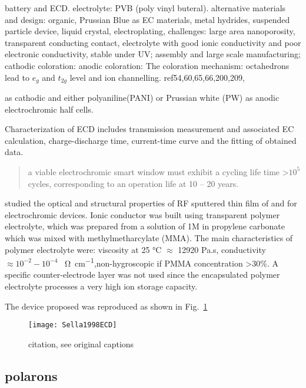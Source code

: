 battery and ECD.\cite{Granqvist2012} electrolyte: PVB (poly vinyl buteral).
alternative materials and design: organic, Prussian Blue as EC materials, metal hydrides, suspended particle device, liquid crystal, electroplating,
challenges: large area nanoporosity, transparent conducting contact, electrolyte with good ionic conductivity and poor electronic conductivity, stable under UV; assembly and large scale manufacturing;
cathodic coloration:
anodic coloration:
The coloration mechanism:  octahedrons lead to $e_g$ and $t_{2g}$ level and ion channelling.
ref54,60,65,66,200,209,


 as cathodic and either polyaniline(PANI) or Prussian white (PW) as anodic electrochromic half cells. \cite{Heckner2002}

Characterization of ECD includes transmission measurement and associated EC calculation, charge-discharge time, current-time curve and the fitting of obtained data.

\begin{quote}
a viable electrochromic smart window must exhibit a cycling life time \textgreater $10^5$ cycles, corresponding to an operation life at 10 -- 20 years.
\end{quote}


\citeauthor{Sella1998} studied the optical and structural properties of RF sputtered thin film of  and  for electrochromic devices. Ionic conductor was built using transparent polymer electrolyte, which was prepared from a solution of 1M  in propylene carbonate which was mixed with methylmetharcylate (MMA). The main characteristics of polymer electrolyte were: viscosity at 25 \si{\degreeCelsius} $\approx$ 12920 Pa.s, conductivity $\approx 10^{-2}-10^{-4}$ \si{\per\ohm\per cm},non-hygroscopic if PMMA concentration \textgreater 30\%. A specific counter-electrode layer was not used since the encapsulated polymer electrolyte processes a very high ion storage capacity.\cite{Sella1998}

The device proposed was reproduced as shown in Fig.~\ref{fig:Sella1998ECD}
\begin{figure}[htb]
    \centering
    \texttt{[image: Sella1998ECD]}
    \caption{citation, see original captions} \label{fig:Sella1998ECD}
\end{figure}

\subsection{polarons}

